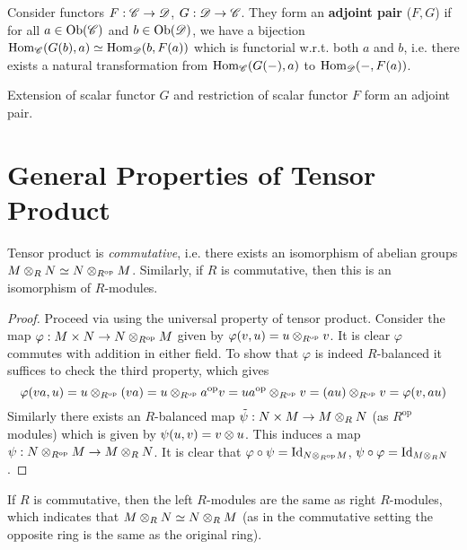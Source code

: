 \documentclass{article}
\begin{document}
\begin{definition}
    Consider functors $F: \mathscr{C} \to \mathscr{D}$, $G: \mathscr{D} \to \mathscr{C}$. They form an \textbf{adjoint pair} ($F, G$) if for all $a \in \mathrm{Ob}(\mathscr{C})$ and $b \in \mathrm{Ob}(\mathscr{D})$, we have a bijection $\mathrm{Hom}_{\mathscr{C}}(G(b), a) \simeq \mathrm{Hom}_{\mathscr{D}}(b, F(a))$ which is functorial w.r.t. both $a$ and $b$, i.e. there exists a natural transformation from $\mathrm{Hom}_{\mathscr{C}}(G(-), a)$ to $\mathrm{Hom}_{\mathscr{D}}(-, F(a))$.
\end{definition}

\begin{remark}
    Extension of scalar functor $G$ and restriction of scalar functor $F$ form an adjoint pair.
\end{remark}

\section{General Properties of Tensor Product}

\def\op{\text{op}}

\begin{proposition}
    Tensor product is \emph{commutative}, i.e. there exists an isomorphism of abelian groups $M \tensor_R N \simeq N \tensor_{R^{\op}} M$. Similarly, if $R$ is commutative, then this is an isomorphism of $R$-modules.
\end{proposition}

\begin{proof}
    Proceed via using the universal property of tensor product. Consider the map $\varphi: M \times N \to N \tensor_{R^{\op}} M$ given by $\varphi(v, u) = u \tensor_{R^{\op}} v$. It is clear $\varphi$ commutes with addition in either field. To show that $\varphi$ is indeed $R$-balanced it suffices to check the third property, which gives 
    \[
        \varphi(va, u) = u \tensor_{R^{\op}} (va) = u \tensor_{R^\op} a^\op v = u a^\op \tensor_{R^\op} v =(au) \tensor_{R^\op} v = \varphi(v, au)
    \]
    Similarly there exists an $R$-balanced map $\tilde{\psi}: N \times M \to M \otimes_R N$ (as $R^\op$ modules) which is given by $\psi(u, v) = v \otimes u$. This induces a map $\psi: N \tensor_{R^\op} M \to M \tensor_R N$. It is clear that $\varphi \circ \psi = \Id_{N \tensor_{R^\op} M}$, $\psi \circ \varphi = \mathrm{Id}_{M \otimes_R N}$. 
\end{proof}

\begin{remark}
    If $R$ is commutative, then the left $R$-modules are the same as right $R$-modules, which indicates that $M \otimes_R N \simeq N \otimes_R M$ (as in the commutative setting the opposite ring is the same as the original ring).
\end{remark}
\end{document}
